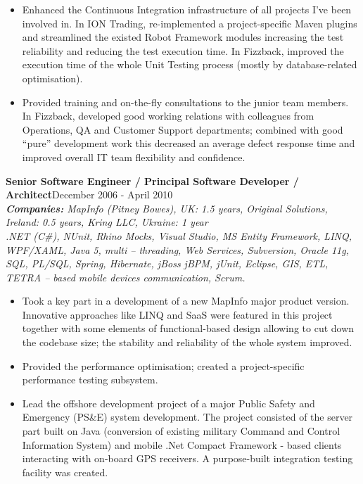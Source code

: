 \documentclass{res}
\newcommand{\aggjobdes}[4]{\needspace{3\baselineskip} %
{\noindent \bf #1\hspace{2ex}}{\hfill #2}\\
{{\noindent \small \textit{ \textbf{ Companies:} {\hfill #3}}}}\\{{\it \small #4.}}}
\begin{document}
\begin{resume}
\begin{itemize}
 \item Enhanced the Continuous Integration infrastructure of all projects I've been involved in. In ION Trading, re-implemented a project-specific Maven plugins and streamlined the existed Robot Framework modules increasing the test reliability and reducing the test execution time. In Fizzback, improved the execution time of the whole Unit Testing process (mostly by database-related optimisation).
 \item Provided training and on-the-fly consultations to the junior team members. In Fizzback, developed good working relations with colleagues from Operations, QA and Customer Support departments; combined with good ``pure'' development work this decreased an average defect response time and improved overall IT team flexibility and confidence.
 \end{itemize}

\aggjobdes {Senior Software Engineer / Principal Software Developer / Architect}{December 2006 - April 2010}
{MapInfo (Pitney Bowes), UK: 1.5 years, Original Solutions, Ireland: 0.5 years, Kring LLC, Ukraine: 1 year}
{.NET (C\#), NUnit, Rhino Mocks, Visual Studio, MS Entity Framework, LINQ, WPF/XAML, Java 5, multi – threading, Web Services, Subversion, Oracle 11g, SQL, PL/SQL, Spring, Hibernate, jBoss jBPM, jUnit, Eclipse, GIS, ETL, TETRA – based mobile devices communication, Scrum}
\begin{itemize} %
 \item Took a key part in a development of a new MapInfo major product version. Innovative approaches like LINQ and SaaS were featured in this project together with some elements of functional-based design allowing to cut down the codebase size; the stability and reliability of the whole system improved.
 \item Provided the performance optimisation; created a project-specific performance testing subsystem.
 \item Lead the offshore development project of a major Public Safety and Emergency (PS\&E) system development. The project consisted of the server part built on Java (conversion of existing military Command and Control Information System) and mobile .Net Compact Framework - based clients interacting with on-board GPS receivers. A purpose-built integration testing facility was created.
\end{itemize}


\end{resume}
\end{document}
